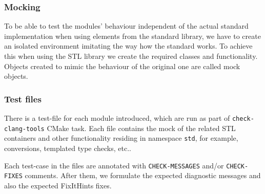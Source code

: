 \subsubsection{Mocking}
\par To be able to test the modules' behaviour independent of the actual standard implementation when using elements from the standard library, we have to create an isolated environment imitating the way how the standard works. To achieve this when using the STL library we create the required classes and functionality. Objects created to mimic the behaviour of the original one are called mock objects.
\subsubsection{Test files}
\par There is a test-file for each module introduced, which are run as part of \verb|check-clang-tools| CMake task. Each file contains the mock of the related STL containers and other functionality residing in namespace \verb|std|, for example, conversions, templated type checks, etc.. \medskip
\par Each test-case in the files are annotated with \verb|CHECK-MESSAGES| and/or \verb|CHECK-FIXES| comments. After them, we formulate the expected diagnostic messages and also the expected FixItHints fixes.
